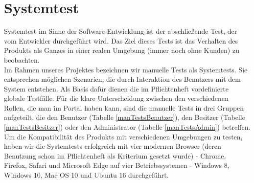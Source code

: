 \documentclass[parskip=full,11pt]{scrartcl}
\begin{document}
\newpage
\section{Systemtest} \label{systemtest}
Systemtest im Sinne der Software-Entwicklung ist der abschlie{\ss}ende Test, der vom Entwickler durchgeführt wird. Das Ziel dieses Tests ist das Verhalten des Produkts als Ganzes in einer realen Umgebung (immer noch ohne Kunden) zu beobachten.\\
Im Rahmen unseres Projektes bezeichnen wir manuelle Tests als Systemtests. Sie entsprechen möglichen Szenarien, die durch Interaktion des Benutzers mit dem System entstehen. Als Basis dafür dienen die im Pflichtenheft vordefinierte globale Testfälle. Für die klare Unterscheidung zwischen den verschiedenen Rollen, die man im Portal haben kann, sind die manuelle Tests in drei Gruppen aufgeteilt, die den Benutzer (Tabelle \ref{manTestsBenutzer}), den Besitzer (Tabelle \ref{manTestsBesitzer}) oder den Administrator (Tabelle \ref{manTestsAdmin}) betreffen.\\
Um die Kompatibilität des Produkts mit verschiedenen Umgebungen zu testen, haben wir die Systemtests erfolgreich mit vier modernen Browser (deren Benutzung schon im Pflichtenheft als Kriterium gesetzt wurde) - Chrome, Firefox, Safari und Microsoft Edge auf vier Betriebssystemen - Windows 8, Windows 10, Mac OS 10 und Ubuntu 16 durchgeführt.  
\end{document}
